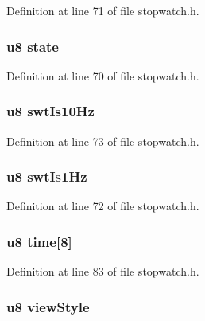\-Definition at line 71 of file stopwatch.\-h.

\hypertarget{structstopwatch_ad0bc4e4e6e6ffc52d9079b73afd73887}{
\subsubsection[{state}]{\setlength{\rightskip}{0pt plus 5cm}u8 {\bf state}}}\label{structstopwatch_ad0bc4e4e6e6ffc52d9079b73afd73887}


\-Definition at line 70 of file stopwatch.\-h.

\hypertarget{structstopwatch_a59a4bb7692742b89191e778942eeccba}{
\subsubsection[{swt\-Is10\-Hz}]{\setlength{\rightskip}{0pt plus 5cm}u8 {\bf swt\-Is10\-Hz}}}\label{structstopwatch_a59a4bb7692742b89191e778942eeccba}


\-Definition at line 73 of file stopwatch.\-h.

\hypertarget{structstopwatch_a26bbaf3a098503cb253a15db2ea626c3}{
\subsubsection[{swt\-Is1\-Hz}]{\setlength{\rightskip}{0pt plus 5cm}u8 {\bf swt\-Is1\-Hz}}}\label{structstopwatch_a26bbaf3a098503cb253a15db2ea626c3}


\-Definition at line 72 of file stopwatch.\-h.

\hypertarget{structstopwatch_a2789a512c999ccb6743da309f32eec05}{
\subsubsection[{time}]{\setlength{\rightskip}{0pt plus 5cm}u8 {\bf time}\mbox{[}8\mbox{]}}}\label{structstopwatch_a2789a512c999ccb6743da309f32eec05}


\-Definition at line 83 of file stopwatch.\-h.

\hypertarget{structstopwatch_a1c3b9f9d799364d05f9abf6892baddef}{
\subsubsection[{view\-Style}]{\setlength{\rightskip}{0pt plus 5cm}u8 {\bf view\-Style}}}\label{structstopwatch_a1c3b9f9d799364d05f9abf6892baddef}


